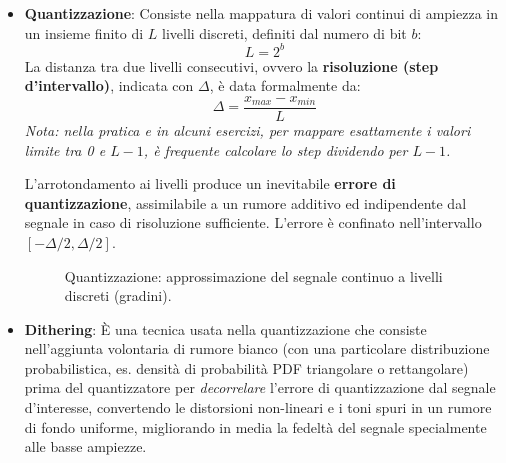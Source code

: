 \begin{itemize}
    \item \textbf{Quantizzazione}: Consiste nella mappatura di valori continui di ampiezza in un insieme finito di $L$ livelli discreti, definiti dal numero di bit $b$:
    \begin{equation}
        L = 2^b
    \end{equation}
    La distanza tra due livelli consecutivi, ovvero la \textbf{risoluzione (step d'intervallo)}, indicata con $\Delta$, è data formalmente da:
    \begin{equation}
        \Delta = \frac{x_{max} - x_{min}}{L}
    \end{equation}
    \textit{Nota: nella pratica e in alcuni esercizi, per mappare esattamente i valori limite tra 0 e $L-1$, è frequente calcolare lo step dividendo per $L-1$.}

    L'arrotondamento ai livelli produce un inevitabile \textbf{errore di quantizzazione}, assimilabile a un rumore additivo ed indipendente dal segnale in caso di risoluzione sufficiente. L'errore è confinato nell'intervallo $[-\Delta/2, \Delta/2]$.

    \vspace{0.5cm}
    \begin{figure}[h!]
        \centering
        \caption{Quantizzazione: approssimazione del segnale continuo a livelli discreti (gradini).}
    \end{figure}
    \vspace{0.5cm}

    \item \textbf{Dithering}: È una tecnica usata nella quantizzazione che consiste nell'aggiunta volontaria di rumore bianco (con una particolare distribuzione probabilistica, es. densità di probabilità PDF triangolare o rettangolare) prima del quantizzatore per \emph{decorrelare} l'errore di quantizzazione dal segnale d'interesse, convertendo le distorsioni non-lineari e i toni spuri in un rumore di fondo uniforme, migliorando in media la fedeltà del segnale specialmente alle basse ampiezze.
\end{itemize}


